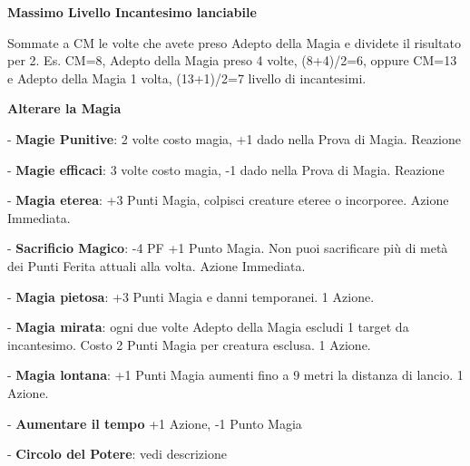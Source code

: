 \documentclass[landscape,10pt,a4paper]{article}
\begin{document}
\begin{multicols}{2}
	
	
	\textbf{Massimo Livello Incantesimo lanciabile}
	
	Sommate a CM le volte che avete preso Adepto della Magia e dividete il risultato per 2. Es. CM=8, Adepto della Magia preso 4 volte, (8+4)/2=6, oppure CM=13 e Adepto della Magia 1 volta, (13+1)/2=7 livello di incantesimi.
	
	
	
	\textbf{Alterare la Magia}
	
	- \textbf{Magie Punitive}: 2 volte costo magia, +1 dado nella Prova di Magia. Reazione
	
	- \textbf{Magie efficaci}: 3 volte costo magia, -1 dado nella Prova di Magia. Reazione
	
	- \textbf{Magia eterea}: +3 Punti Magia, colpisci creature eteree o incorporee. Azione Immediata.
	
	- \textbf{Sacrificio Magico}: -4 PF +1 Punto Magia. Non puoi sacrificare più di metà dei Punti Ferita attuali alla volta. Azione Immediata.
	
	- \textbf{Magia pietosa}: +3 Punti Magia e danni temporanei. 1 Azione.
	
	- \textbf{Magia mirata}: ogni due volte Adepto della Magia escludi 1 target da incantesimo. Costo 2 Punti Magia per creatura esclusa. 1 Azione.
	
	- \textbf{Magia lontana}: +1 Punti Magia aumenti fino a 9 metri la distanza di lancio. 1 Azione.
	
	- \textbf{Aumentare il tempo} +1 Azione,  -1 Punto Magia
	
	- \textbf{Circolo del Potere}: vedi descrizione
	

\end{multicols}
\end{document}
